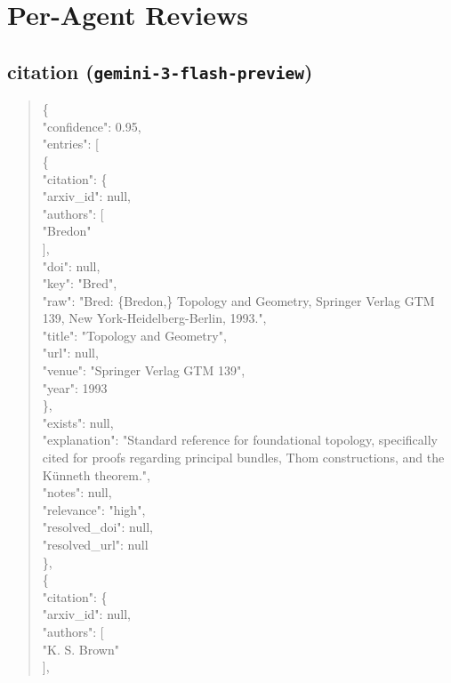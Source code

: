 \documentclass[11pt]{article}
\begin{document}
\section*{Per-Agent Reviews}
\subsection*{citation (\texttt{gemini-3-flash-preview})}
\begin{quote}\small\ttfamily\raggedright
\{\\
  "confidence": 0.95,\\
  "entries": [\\
    \{\\
      "citation": \{\\
        "arxiv\_id": null,\\
        "authors": [\\
          "Bredon"\\
        ],\\
        "doi": null,\\
        "key": "Bred",\\
        "raw": "Bred: \{Bredon,\} Topology and Geometry, Springer Verlag GTM 139, New York-Heidelberg-Berlin, 1993.",\\
        "title": "Topology and Geometry",\\
        "url": null,\\
        "venue": "Springer Verlag GTM 139",\\
        "year": 1993\\
      \},\\
      "exists": null,\\
      "explanation": "Standard reference for foundational topology, specifically cited for proofs regarding principal bundles, Thom constructions, and the Künneth theorem.",\\
      "notes": null,\\
      "relevance": "high",\\
      "resolved\_doi": null,\\
      "resolved\_url": null\\
    \},\\
    \{\\
      "citation": \{\\
        "arxiv\_id": null,\\
        "authors": [\\
          "K. S. Brown"\\
        ],\\

\end{quote}
\end{document}

